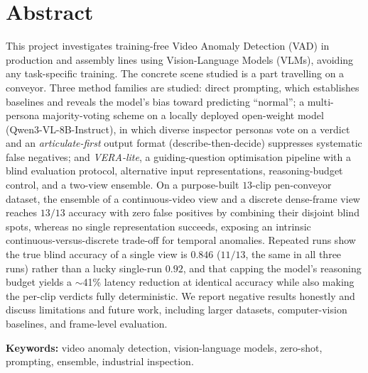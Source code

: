 \chapter*{Abstract}

This project investigates training-free Video Anomaly Detection (VAD) in production and
assembly lines using Vision-Language Models (VLMs), avoiding any task-specific training.
The concrete scene studied is a part travelling on a conveyor. Three method families are studied: direct prompting, which establishes
baselines and reveals the model's bias toward predicting ``normal''; a multi-persona
majority-voting scheme on a locally deployed open-weight model
(Qwen3-VL-8B-Instruct), in which diverse inspector personas vote on a verdict and an
\emph{articulate-first} output format (describe-then-decide) suppresses systematic
false negatives; and \emph{VERA-lite}, a guiding-question optimisation pipeline with a
blind evaluation protocol, alternative input representations, reasoning-budget control,
and a two-view ensemble. On a purpose-built $13$-clip pen-conveyor dataset, the ensemble
of a continuous-video view and a discrete dense-frame view reaches $13/13$ accuracy with
zero false positives by combining their disjoint blind spots, whereas no single
representation succeeds, exposing an intrinsic continuous-versus-discrete trade-off for
temporal anomalies. Repeated runs show the true blind accuracy of a single view is
$0.846$ ($11/13$, the same in all three runs) rather than a lucky single-run $0.92$, and
that capping the model's reasoning budget yields a $\sim$41\% latency reduction at
identical accuracy while also making the per-clip verdicts fully deterministic. We report
negative results honestly and discuss limitations and future work, including larger
datasets, computer-vision baselines, and frame-level evaluation.

\vfill
\textbf{Keywords:} video anomaly detection, vision-language models, zero-shot,
prompting, ensemble, industrial inspection.
\clearpage
